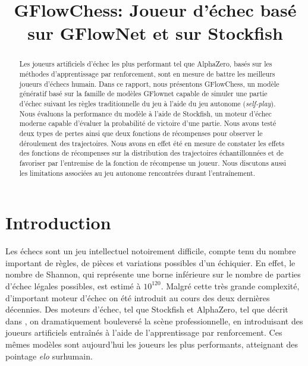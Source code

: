 \documentclass[11pt]{article}
\title{GFlowChess: Joueur d'échec basé sur GFlowNet et sur Stockfish}
\author[1]{\nameemail{Yizhan Li}{yizhan.li@umontreal.ca}}
\author[1]{\nameemail{Olivier
    Déry-Prévost}{olivier.dery-prevost@umontreal.ca}}
\author[1]{\nameemail{Sidya Galakho}{sidya.galakho@umontreal.ca}}
\author[1]{\nameemail{Simon Théorêt}{simon.theoret.1@umontreal.ca}}
\affil[1]{Université de Montréal}
\begin{document}
\maketitle


\begin{abstract}
  Les joueurs artificiels d'échec les plus performant tel que
  AlphaZero, basés sur les méthodes d'apprentissage par renforcement,
  sont en mesure de battre les meilleurs joueurs d'échecs humain.
  Dans ce rapport, nous présentons GFlowChess, un modèle génératif
  basé sur la famille de modèles GFlownet capable de simuler une
  partie d'échec suivant les règles traditionnelle du jeu à l'aide du
  jeu autonome (\textit{self-play}). Nous évaluons la performance du
  modèle à l'aide de Stockfish, un moteur d'échec moderne capable
  d'évaluer la probabilité de victoire d'une partie. Nous avons testé
  deux types de pertes ainsi que deux fonctions de récompenses pour
  observer le déroulement des trajectoires. Nous avons en effet été en
  mesure de constater les effets des fonctions de récompenses sur la
  distribution des trajectoires échantillonnées et de favoriser par
  l'entremise de la fonction de récompense un joueur. Nous discutons
  aussi les limitations associées au jeu autonome rencontrées durant
  l'entraînement.
\end{abstract}

\section*{Introduction}
Les échecs sont un jeu intellectuel notoirement difficile, compte tenu
du nombre important de règles, de pièces et variations possibles d'un
échiquier. En effet, le nombre de Shannon, qui représente une borne
inférieure sur le nombre de parties d'échec légales possibles, est
estimé à $10^{120}$. Malgré cette très grande complexité, d'important
moteur d'échec on été introduit au cours des deux dernières
décennies. Des moteurs d'échec, tel que Stockfish et AlphaZero, tel
que décrit dans \citet{AlphaZero}, on dramatiquement bouleversé la
scène professionnelle, en introduisant des joueurs artificiels
entraînés à l'aide de l'apprentissage par renforcement. Ces mêmes
modèles sont aujourd'hui les joueurs les plus performants, atteignant
des pointage \textit{elo} surhumain.
\end{document}
